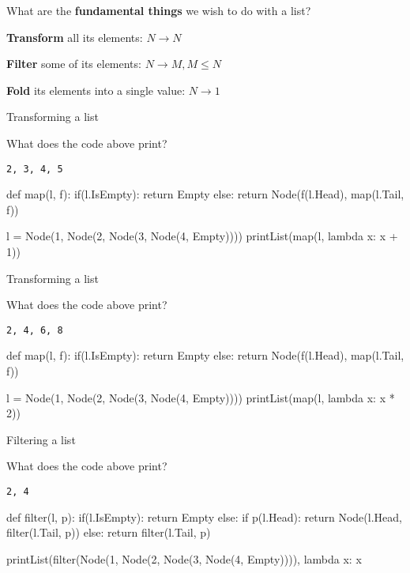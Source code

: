 \documentclass{beamer}
\begin{document}
\begin{slide}{
\item What are the \textbf{fundamental things} we wish to do with a list?
\pause
\item \textbf{Transform} all its elements: $N \rightarrow N$
\pause
\item \textbf{Filter} some of its elements: $N \rightarrow M, M \leq N$
\pause
\item \textbf{Fold} its elements into a single value: $N \rightarrow 1$
}\end{slide}

\begin{frame}[fragile]{Transforming a list}
\begin{codewithblock}{\item What does the code above print? \pause \item \texttt{2, 3, 4, 5}}
def map(l, f):
  if(l.IsEmpty):
    return Empty
  else:
    return Node(f(l.Head), map(l.Tail, f))
    
l = Node(1, Node(2, Node(3, Node(4, Empty))))
printList(map(l, lambda x: x + 1))
\end{codewithblock}
\end{frame}

\begin{frame}[fragile]{Transforming a list}
\begin{codewithblock}{\item What does the code above print? \pause \item \texttt{2, 4, 6, 8}}
def map(l, f):
  if(l.IsEmpty):
    return Empty
  else:
    return Node(f(l.Head), map(l.Tail, f))

l = Node(1, Node(2, Node(3, Node(4, Empty))))
printList(map(l, lambda x: x * 2))
\end{codewithblock}
\end{frame}

\begin{frame}[fragile]{Filtering a list}
\begin{codewithblock}{\item What does the code above print? \pause \item \texttt{2, 4}}
def filter(l, p):
  if(l.IsEmpty):
    return Empty
  else:
    if p(l.Head):
      return Node(l.Head, filter(l.Tail, p))
    else:
      return filter(l.Tail, p)

printList(filter(Node(1, Node(2, Node(3, Node(4, Empty)))), lambda x: x %
\end{codewithblock}
\end{frame}
\end{document}
